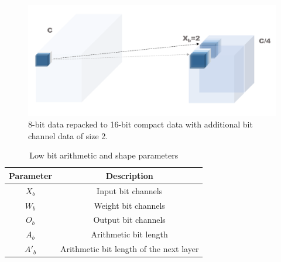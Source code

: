 \begin{figure}[h]
    \centering
    \includegraphics[width=0.7\linewidth]{inc/3_low_numeric_convolution_neural_network/figure/re_pack2.png}
    \caption{8-bit data repacked to 16-bit compact data with additional bit channel data of size 2.}
    \label{fig:re_pack2}
\end{figure}
\begin{table}[h]
    \caption{Low bit arithmetic and shape parameters}
    \label{tab:bit_shape}
    \centering
    \footnotesize 
        \begin{tabular}{cc}
        \toprule
        Parameter & Description \\
        \midrule
        $X_b$ & Input bit channels\\
        $W_b$ & Weight bit channels\\
        $O_b$ & Output bit channels\\
        $A_b$ & Arithmetic bit length\\
        $A'_b$ & Arithmetic bit length of the next layer\\
        \bottomrule
        \end{tabular}
\end{table}

